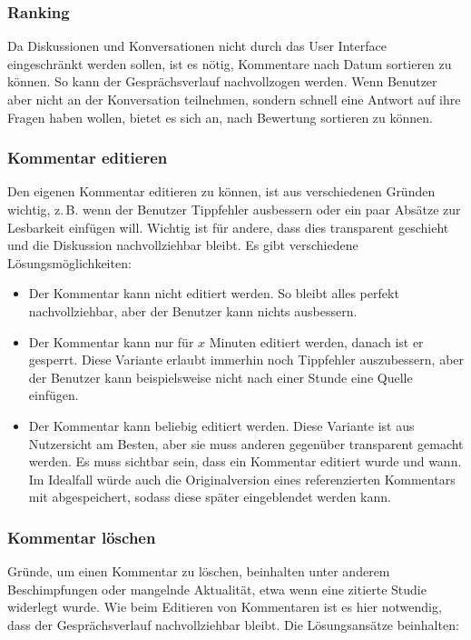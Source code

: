 \documentclass[
	headsepline,
	footsepline,
	fontsize=12pt,
	bibliography=totoc
]{scrbook}
\begin{document}
\subsubsection{Ranking}

Da Diskussionen und Konversationen nicht durch das User Interface eingeschränkt werden sollen, ist es nötig, Kommentare nach Datum sortieren zu können. So kann der Gesprächsverlauf nachvollzogen werden. Wenn Benutzer aber nicht an der Konversation teilnehmen, sondern schnell eine Antwort auf ihre Fragen haben wollen, bietet es sich an, nach Bewertung sortieren zu können.

\subsubsection{Kommentar editieren}

Den eigenen Kommentar editieren zu können, ist aus verschiedenen Gründen wichtig, z.\,B. wenn der Benutzer Tippfehler ausbessern oder ein paar Absätze zur Lesbarkeit einfügen will. Wichtig ist für andere, dass dies transparent geschieht und die Diskussion nachvollziehbar bleibt. Es gibt verschiedene Lösungsmöglichkeiten:

\begin{itemize}
	\item Der Kommentar kann nicht editiert werden. So bleibt alles perfekt nachvollziehbar, aber der Benutzer kann nichts ausbessern.
	\item Der Kommentar kann nur für $x$ Minuten editiert werden, danach ist er gesperrt. Diese Variante erlaubt immerhin noch Tippfehler auszubessern, aber der Benutzer kann beispielsweise nicht nach einer Stunde eine Quelle einfügen.
	\item Der Kommentar kann beliebig editiert werden. Diese Variante ist aus Nutzersicht am Besten, aber sie muss anderen gegenüber transparent gemacht werden. Es muss sichtbar sein, dass ein Kommentar editiert wurde und wann. Im Idealfall würde auch die Originalversion eines referenzierten Kommentars mit abgespeichert, sodass diese später eingeblendet werden kann.
\end{itemize}

\subsubsection{Kommentar löschen}

Gründe, um einen Kommentar zu löschen, beinhalten unter anderem Beschimpfungen oder mangelnde Aktualität, etwa wenn eine zitierte Studie widerlegt wurde. Wie beim Editieren von Kommentaren ist es hier notwendig, dass der Gesprächsverlauf nachvollziehbar bleibt. Die Lösungsansätze beinhalten:
\end{document}
